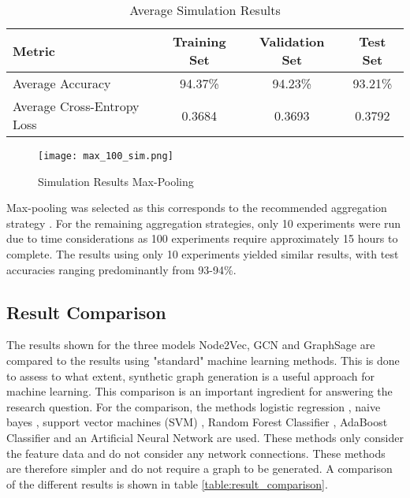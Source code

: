   \begin{table}[h]
    \centering
      \begin{tabular}{|l||c|c|c|}
      \hline
      \textbf{Metric} & \textbf{Training Set} & \textbf{Validation Set} & 
      \textbf{Test Set}\\
      \hline\hline
      Average Accuracy & 94.37\% & 94.23\% & 93.21\% \\\hline 
      Average Cross-Entropy Loss & 0.3684 & 0.3693 & 0.3792 \\
      \hline
      \end{tabular}
    \caption{Average Simulation Results}
    \label{table:simulation_results}
  \end{table}

  \begin{figure}[h]
		\centering
		\texttt{[image: max\_100\_sim.png]}
		\caption{Simulation Results Max-Pooling}
        \label{fig:simulation_results}
  \end{figure}

  \noindent Max-pooling was selected as this corresponds to the recommended
  aggregation strategy \citep[p. 9]{hamilton2017inductive}. For the remaining
  aggregation strategies, only 10 experiments were run due to time
  considerations as 100 experiments require approximately 15 hours to complete.
  The results using only 10 experiments yielded similar results, with test
  accuracies ranging predominantly from 93-94\%. 

  \subsection{Result Comparison}

  The results shown for the three models Node2Vec, GCN and GraphSage are
  compared to the results using "standard" machine learning methods. This is
  done to assess to what extent, synthetic graph generation is a useful
  approach for machine learning. This comparison is an important ingredient for
  answering the research question. For the comparison, the methods logistic
  regression \citep{cramer2002origins}, naive bayes \citep{zhang2004bayes},
  support vector machines (SVM) \citep{platt1999probabilistic,chang2011libsvm},
  Random Forest Classifier \citep{breiman2001random}, AdaBoost Classifier
  \citep{freund1997decision,hastie2009multi} and an Artificial Neural Network
  \citep{mcculloch1943logical} are used. These methods only consider the
  feature data and do not consider any network connections. These methods are
  therefore simpler and do not require a graph to be generated. A comparison of
  the different results is shown in table \ref{table:result_comparison}.


